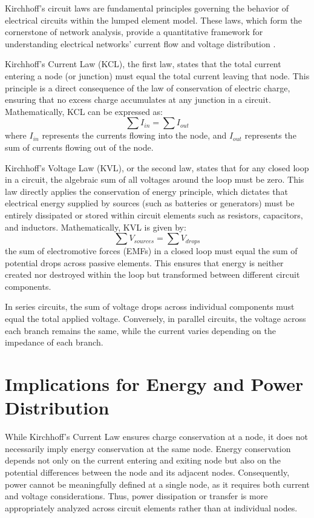 \documentclass[11pt, a4paper]{article}
\theoremstyle{definition}
\theoremstyle{plain}
\theoremstyle{plain}
\theoremstyle{remark}
\theoremstyle{remark}
\theoremstyle{remark}
\begin{document}
Kirchhoff’s circuit laws are fundamental principles governing the behavior of electrical circuits within the lumped element model. These laws, which form the cornerstone of network analysis, provide a quantitative framework for understanding electrical networks' current flow and voltage distribution \cite{Athavale2018}.

Kirchhoff’s Current Law (KCL), the first law, states that the total current entering a node (or junction) must equal the total current leaving that node. This principle is a direct consequence of the law of conservation of electric charge, ensuring that no excess charge accumulates at any junction in a circuit. Mathematically, KCL can be expressed as:
\[
\sum I_{in} = \sum I_{out}
\]
where $ I_{in} $ represents the currents flowing into the node, and $ I_{out} $ represents the sum of currents flowing out of the node.

Kirchhoff’s Voltage Law (KVL), or the second law, states that for any closed loop in a circuit, the algebraic sum of all voltages around the loop must be zero. This law directly applies the conservation of energy principle, which dictates that electrical energy supplied by sources (such as batteries or generators) must be entirely dissipated or stored within circuit elements such as resistors, capacitors, and inductors. Mathematically, KVL is given by:
\[
\sum V_{sources} = \sum V_{drops}
\]
the sum of electromotive forces (EMFs) in a closed loop must equal the sum of potential drops across passive elements. This ensures that energy is neither created nor destroyed within the loop but transformed between different circuit components.

In series circuits, the sum of voltage drops across individual components must equal the total applied voltage. Conversely, in parallel circuits, the voltage across each branch remains the same, while the current varies depending on the impedance of each branch.


{\centering
	\section*{\sf Implications for Energy and Power Distribution}}

While Kirchhoff’s Current Law ensures charge conservation at a node, it does not necessarily imply energy conservation at the same node. Energy conservation depends not only on the current entering and exiting node but also on the potential differences between the node and its adjacent nodes. Consequently, power cannot be meaningfully defined at a single node, as it requires both current and voltage considerations. Thus, power dissipation or transfer is more appropriately analyzed across circuit elements rather than at individual nodes.
\end{document}

